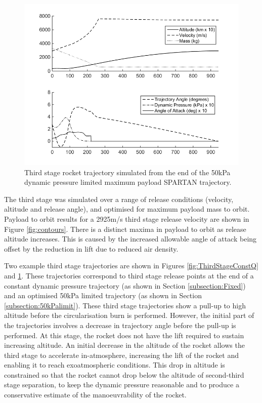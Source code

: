 \documentclass[]{aiaa-tc}
\begin{document}
  \begin{figure}[ht]
  	
  	\centering
  	\includegraphics[width=0.8\linewidth]{ThirdStage50kpaConstrained}
  	\caption{Third stage rocket trajectory simulated from the end of the 50kPa dynamic pressure limited maximum payload SPARTAN trajectory.}
  	\label{fig:ThirdStage50kPa}
  \end{figure}
  
The third stage was simulated over a range of release conditions (velocity, altitude and release angle), and optimised for maximum payload mass to orbit.
Payload to orbit results for a 2925m/s third stage release velocity are shown in Figure \ref{fig:contours}. There is a distinct maxima in payload to orbit as release altitude increases. This is caused by the increased allowable angle of attack being offset by the reduction in lift due to reduced air density.


Two example third stage trajectories are shown in Figures \ref{fig:ThirdStageConstQ} and \ref{fig:ThirdStage50kPa}. These trajectories correspond to third stage release points at the end of a constant dynamic pressure trajectory (as shown in Section \ref{subsection:Fixed}) and an optimised 50kPa limited trajectory  (as shown in Section \ref{subsection:50kPalimit}). 
These third stage trajectories show a pull-up to high altitude before the circularisation burn is performed. 
However, the initial part of the trajectories involves a decrease in trajectory angle before the pull-up is performed. At this stage, the rocket does not have the lift required to sustain increasing altitude. An initial decrease in the altitude of the rocket allows the third stage to accelerate in-atmosphere, increasing the lift of the rocket and enabling it to reach exoatmospheric conditions. This drop in altitude is constrained so that the rocket cannot drop below the altitude of second-third stage separation, to keep the dynamic pressure reasonable and to produce a conservative estimate of the manoeuvrability of the rocket.
\end{document}

